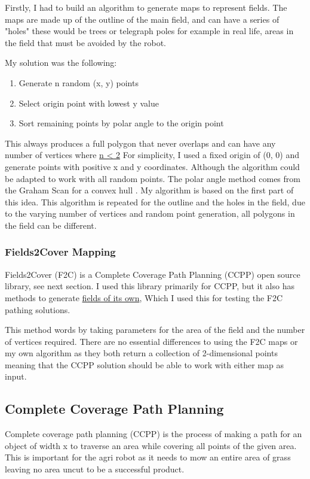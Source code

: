 \documentclass[progress]{cmpreport}
\begin{document}
Firstly, I had to build an algorithm to generate maps to represent fields. The maps are made up of the outline of the main field,
and can have a series of "holes" these would be trees or telegraph poles for example in real life, areas in the field that must be avoided by the robot.

My solution was the following:
\begin{enumerate}
	\item{Generate n random (x, y) points}
	\item{Select origin point with lowest y value}
	\item{Sort remaining points by polar angle to the origin point}
\end{enumerate}

This always produces a full polygon that never overlaps and can have any number of vertices where \hyperref[Mapping]{n < 2}
For simplicity, I used a fixed origin of (0, 0) and generate points with positive x and y coordinates. Although the algorithm could be adapted to work with all random points.
The polar angle method comes from the Graham Scan for a convex hull \cite{geeksforgeeks2023}.
My algorithm is based on the first part of this idea.
This algorithm is repeated for the outline and the holes in the field, due to the varying number of vertices and random point generation, all polygons in the field can be different.


\subsubsection{Fields2Cover Mapping}
Fields2Cover (F2C) is a Complete Coverage Path Planning (CCPP) open source library, see next section.
I used this library primarily for CCPP, but it also has methods to generate \hyperref[F2CMapping]{fields of its own},
Which I used this for testing the F2C pathing solutions.

This method words by taking parameters for the area of the field and the number of vertices required.
There are no essential differences to using the F2C maps or my own algorithm as they both return a collection of 2-dimensional points meaning that the CCPP solution should be able to work with either map as input.

\subsection{Complete Coverage Path Planning}
Complete coverage path planning (CCPP) is the process of making a path for an object of width x to traverse an area while covering all points of the given area.
This is important for the agri robot as it needs to mow an entire area of grass leaving no area uncut to be a successful product.
\end{document}
